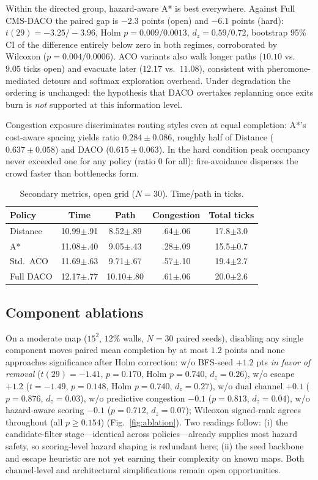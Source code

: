 ﻿\documentclass[conference]{IEEEtran}
\begin{document}
Within the directed group, hazard-aware A* is best everywhere. Against Full CMS-DACO the paired gap is $-2.3$ points (open) and $-6.1$ points (hard): $t(29){=}{-}3.25/{-}3.96$, Holm $p{=}0.009/0.0013$, $d_z{=}0.59/0.72$, bootstrap 95\% CI of the difference entirely below zero in both regimes, corroborated by Wilcoxon ($p{=}0.004/0.0006$). ACO variants also walk longer paths ($10.10$ vs.\ $9.05$ ticks open) and evacuate later ($12.17$ vs.\ $11.08$), consistent with pheromone-mediated detours and softmax exploration overhead. Under degradation the ordering is unchanged: the hypothesis that DACO overtakes replanning once exits burn is \emph{not} supported at this information level.

Congestion exposure discriminates routing styles even at equal completion: A*'s cost-aware spacing yields ratio $0.284\pm0.086$, roughly half of Distance ($0.637\pm0.058$) and DACO ($0.615\pm0.063$). In the hard condition peak occupancy never exceeded one for any policy (ratio $0$ for all): fire-avoidance disperses the crowd faster than bottlenecks form.

\begin{table}[t]
\centering
\caption{Secondary metrics, open grid ($N{=}30$). Time/path in ticks.}
\label{tab:secondary}
\setlength{\tabcolsep}{4pt}
\begin{tabular}{lcccc}
\toprule
Policy & Time & Path & Congestion & Total ticks\\
\midrule
Distance & 10.99$\pm$.91 & 8.52$\pm$.89 & .64$\pm$.06 & 17.8$\pm$3.0\\
A* & 11.08$\pm$.40 & 9.05$\pm$.43 & .28$\pm$.09 & 15.5$\pm$0.7\\
Std.\ ACO & 11.69$\pm$.63 & 9.71$\pm$.67 & .57$\pm$.10 & 19.4$\pm$2.7\\
Full DACO & 12.17$\pm$.77 & 10.10$\pm$.80 & .61$\pm$.06 & 20.0$\pm$2.6\\
\bottomrule
\end{tabular}
\end{table}

\subsection{Component ablations}
On a moderate map ($15^2$, $12\%$ walls, $N{=}30$ paired seeds), disabling any single component moves paired mean completion by at most $1.2$ points and none approaches significance after Holm correction: w/o BFS-seed $+1.2$ pts \emph{in favor of removal} ($t(29){=}{-}1.41$, $p{=}0.170$, Holm $p{=}0.740$, $d_z{=}0.26$), w/o escape $+1.2$ ($t{=}{-}1.49$, $p{=}0.148$, Holm $p{=}0.740$, $d_z{=}0.27$), w/o dual channel $+0.1$ ($p{=}0.876$, $d_z{=}0.03$), w/o predictive congestion $-0.1$ ($p{=}0.813$, $d_z{=}0.04$), w/o hazard-aware scoring $-0.1$ ($p{=}0.712$, $d_z{=}0.07$); Wilcoxon signed-rank agrees throughout (all $p{\geq}0.154$) (Fig.~\ref{fig:ablation}). Two readings follow: (i) the candidate-filter stage---identical across policies---already supplies most hazard safety, so scoring-level hazard shaping is redundant here; (ii) the seed backbone and escape heuristic are not yet earning their complexity on known maps. Both channel-level and architectural simplifications remain open opportunities.
\end{document}
